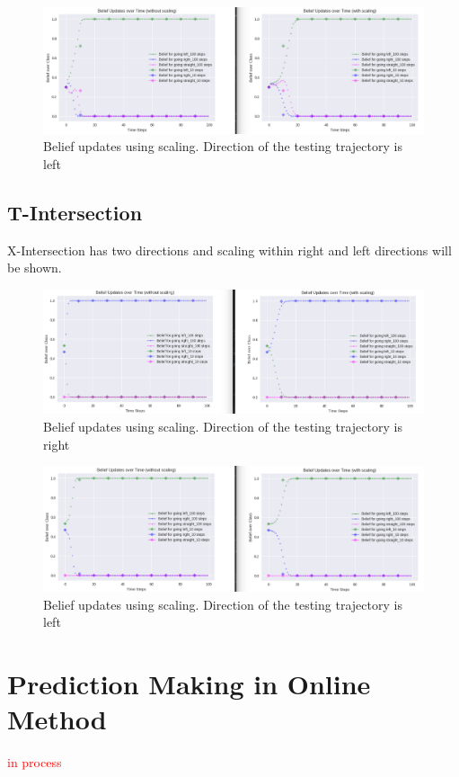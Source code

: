 \begin{figure}[H]
	\centering  	
	\includegraphics[width=15cm]{img/Scaling_Left_X.jpg}
	\caption{Belief updates using scaling. Direction of the testing trajectory is left}
	\label{fig:ScallingLeftX}    
\end{figure}


\subsection{T-Intersection}

X-Intersection has two directions and scaling within right and left directions will be shown.

\begin{figure}[H]
	\centering  	
	\includegraphics[width=15cm]{img/Scaling_Right_T.jpg}
	\caption{Belief updates using scaling. Direction of the testing trajectory is right}
	\label{fig:ScallingRightT}    
\end{figure}

\begin{figure}[H]
	\centering  	
	\includegraphics[width=15cm]{img/Scaling_Left_T.jpg}
	\caption{Belief updates using scaling. Direction of the testing trajectory is left}
	\label{fig:ScallingLeftT}    
\end{figure}

\section{Prediction Making in Online Method}

\textcolor{red}{in process}